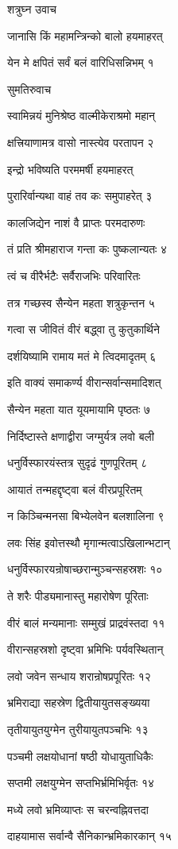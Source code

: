 
शत्रुघ्न उवाच

जानासि किं महामन्त्रिन्को बालो हयमाहरत्

येन मे क्षपितं सर्वं बलं वारिधिसन्निभम् १

सुमतिरुवाच

स्वामिन्नयं मुनिश्रेष्ठ वाल्मीकेराश्रमो महान्

क्षत्त्रियाणामत्र वासो नास्त्येव परतापन २

इन्द्रो भविष्यति परममर्षी हयमाहरत्

पुरारिर्वान्यथा वाहं तव कः समुपाहरेत् ३

कालजिद्येन नाशं वै प्राप्तः परमदारुणः

तं प्रति श्रीमहाराज गन्ता कः पुष्कलान्यतः ४

त्वं च वीरैर्भटैः सर्वैराजभिः परिवारितः

तत्र गच्छस्व सैन्येन महता शत्रुकृन्तन ५

गत्वा स जीवितं वीरं बद्ध्वा तु कुतुकार्थिने

दर्शयिष्यामि रामाय मतं मे त्विदमादृतम् ६

इति वाक्यं समाकर्ण्य वीरान्सर्वान्समादिशत्

सैन्येन महता यात यूयमायामि पृष्ठतः ७

निर्दिष्टास्ते क्षणाद्वीरा जग्मुर्यत्र लवो बली

धनुर्विस्फारयंस्तत्र सुदृढं गुणपूरितम् ८

आयातं तन्महद्दृष्ट्वा बलं वीरप्रपूरितम्

न किञ्चिन्मनसा बिभ्येलवेन बलशालिना ९

लवः सिंह इवोत्तस्थौ मृगान्मत्वाऽखिलान्भटान्

धनुर्विस्फारयन्रोषाच्छरान्मुञ्चन्सहस्रशः १०

ते शरैः पीड्यमानास्तु महारोषेण पूरिताः

वीरं बालं मन्यमानाः सम्मुखं प्राद्रवंस्तदा ११

वीरान्सहस्रशो दृष्ट्वा भ्रमिभिः पर्यवस्थितान्

लवो जवेन सन्धाय शरान्रोषप्रपूरितः १२

भ्रमिराद्या सहस्रेण द्वितीयायुतसङ्ख्यया

तृतीयायुतयुग्मेन तुरीयायुतपञ्चभिः १३

पञ्चमी लक्षयोधानां षष्ठी योधायुताधिकैः

सप्तमी लक्षयुग्मेन सप्तभिर्भ्रमिभिर्वृतः १४

मध्ये लवो भ्रमिव्याप्तः स चरन्वह्निवत्तदा

दाहयामास सर्वान्वै सैनिकान्भ्रमिकारकान् १५

